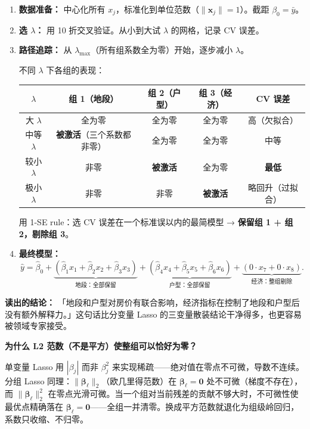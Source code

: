 \begin{enumerate}[label=第 \arabic* 步：, leftmargin=*]
    \item \textbf{数据准备：} 中心化所有 $x_j$，标准化到单位范数（$\|\mathbf{x}_j\|=1$）。截距 $\beta_0 = \bar{y}$。
    \item \textbf{选 $\lambda$：} 用 10 折交叉验证。从小到大试 $\lambda$ 的网格，记录 CV 误差。
    \item \textbf{路径追踪：} 从 $\lambda_{\max}$（所有组系数全为零）开始，逐步减小 $\lambda$。
    
    不同 $\lambda$ 下各组的表现：
    
    \begin{center}
    \renewcommand{\arraystretch}{1.3}
    \begin{tabular}{c|c|c|c|c}
    \toprule
    $\lambda$ & \textbf{组 1（地段）} & \textbf{组 2（户型）} & \textbf{组 3（经济）} & \textbf{CV 误差} \\
    \midrule
    大 $\lambda$ & 全为零 & 全为零 & 全为零 & 高（欠拟合）\\
    中等 $\lambda$ & \textbf{被激活}（三个系数都非零）& 全为零 & 全为零 & 中等 \\
    较小 $\lambda$ & 非零 & \textbf{被激活} & 全为零 & \textbf{最低} \\
    极小 $\lambda$ & 非零 & 非零 & \textbf{被激活} & 略回升（过拟合）\\
    \bottomrule
    \end{tabular}
    \end{center}
    
    用 1-SE rule：选 CV 误差在一个标准误以内的最简模型 → \textbf{保留组 1 + 组 2，剔除组 3}。
    
    \item \textbf{最终模型：}
    \[
        \hat{y} = \hat{\beta}_0 + \underbrace{(\hat{\beta}_1 x_1 + \hat{\beta}_2 x_2 + \hat{\beta}_3 x_3)}_{\text{地段：全部保留}}
        + \underbrace{(\hat{\beta}_4 x_4 + \hat{\beta}_5 x_5 + \hat{\beta}_6 x_6)}_{\text{户型：全部保留}}
        + \underbrace{(0 \cdot x_7 + 0 \cdot x_8)}_{\text{经济：整组剔除}}.
    \]
\end{enumerate}

\textbf{读出的结论：} 「地段和户型对房价有联合影响，经济指标在控制了地段和户型后没有额外解释力。」这句话比分变量 Lasso 的三变量散装结论干净得多，也更容易被领域专家接受。

\textbf{为什么 L2 范数（不是平方）使整组可以恰好为零？}

单变量 Lasso 用 $|\beta_j|$ 而非 $\beta_j^2$ 来实现稀疏——绝对值在零点不可微，导数不连续。分组 Lasso 同理：$\|\bm{\beta}_\ell\|_2$（欧几里得范数）在 $\bm{\beta}_\ell = \mathbf{0}$ 处不可微（梯度不存在），而 $\|\bm{\beta}_\ell\|_2^2$ 在零点光滑可微。当一个组对当前残差的贡献不够大时，不可微性使最优点精确落在 $\bm{\beta}_\ell = \mathbf{0}$——全组一并清零。换成平方范数就退化为组级岭回归，系数只收缩、不归零。

